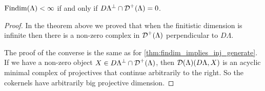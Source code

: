 \begin{theorem}\cite[Theorem~4.4]{Rick19}
	$\operatorname{Findim}(\Lambda) < \infty$ if and only if $D\Lambda^\perp \cap \operatorname{\mathcal{D}}^+(\Lambda) = 0$.
	\begin{proof}
		In the theorem above we proved that when the finitistic dimension is infinite then there is a non-zero complex in $\operatorname{\mathcal{D}}^+(\Lambda)$ perpendicular to $D\Lambda$. 
		
		The proof of the converse is the same as for \cref{thm:findim_implies_inj_generate}. If we have a non-zero object $X \in D\Lambda^\perp \cap \operatorname{\mathcal{D}}^+(\Lambda)$, then $\operatorname{\mathcal{D}}(\Lambda)(D\Lambda, X)$ is an acyclic minimal complex of projectives that continue arbitrarily to the right. So the cokernels have arbitrarily big projective dimension. 
	\end{proof}
\end{theorem}